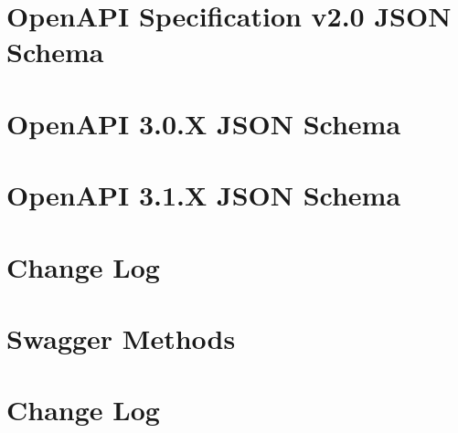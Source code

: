 \documentclass[twoside]{book}
\newcommand{\+}{\discretionary{\mbox{\scriptsize$\hookleftarrow$}}{}{}}
\begin{document}
\chapter{Open\+API Specification v2.0 JSON Schema}
\label{md_Backend_nodejs_node_modules__apidevtools_openapi_schemas_schemas_v2_0_README}

\chapter{Open\+API 3.0.X JSON Schema}
\label{md_Backend_nodejs_node_modules__apidevtools_openapi_schemas_schemas_v3_0_README}

\chapter{Open\+API 3.1.X JSON Schema}
\label{md_Backend_nodejs_node_modules__apidevtools_openapi_schemas_schemas_v3_1_README}

\chapter{Change Log}
\label{md_Backend_nodejs_node_modules__apidevtools_swagger_methods_CHANGELOG}

\chapter{Swagger Methods}
\label{md_Backend_nodejs_node_modules__apidevtools_swagger_methods_README}

\chapter{Change Log}
\label{md_Backend_nodejs_node_modules__apidevtools_swagger_parser_CHANGELOG}

\end{document}
